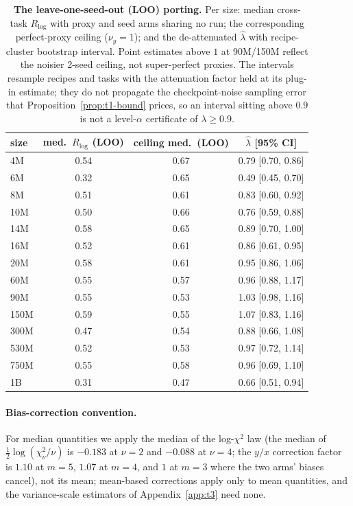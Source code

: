 \begin{table}[!htbp]
\centering
\caption{\textbf{The leave-one-seed-out (LOO) porting.} Per size: median cross-task $R_{\log}$ with
proxy and seed arms sharing no run; the corresponding perfect-proxy ceiling ($\nu_y = 1$); and
the de-attenuated $\hat\lambda$ with recipe-cluster bootstrap interval. Point estimates above
$1$ at 90M/150M reflect the noisier 2-seed ceiling, not super-perfect proxies. The intervals
resample recipes and tasks with the attenuation factor held at its plug-in estimate; they do
not propagate the checkpoint-noise sampling error that
Proposition~\ref{prop:t1-bound} prices, so an interval sitting above $0.9$ is not a
level-$\alpha$ certificate of $\lambda \ge 0.9$.}
\label{tab:lambda-loo}
\footnotesize
\setlength{\tabcolsep}{4pt}
\begin{tabular}{@{}lccc@{}}
\toprule
size & med.\ $R_{\log}$ (LOO) & ceiling med.\ (LOO) & $\hat\lambda$ [95\% CI] \\
\midrule
4M & 0.54 & 0.67 & 0.79 [0.70, 0.86] \\
6M & 0.32 & 0.65 & 0.49 [0.45, 0.70] \\
8M & 0.51 & 0.61 & 0.83 [0.60, 0.92] \\
10M & 0.50 & 0.66 & 0.76 [0.59, 0.88] \\
14M & 0.58 & 0.65 & 0.89 [0.70, 1.00] \\
16M & 0.52 & 0.61 & 0.86 [0.61, 0.95] \\
20M & 0.58 & 0.61 & 0.95 [0.86, 1.06] \\
60M & 0.55 & 0.57 & 0.96 [0.88, 1.17] \\
90M & 0.55 & 0.53 & 1.03 [0.98, 1.16] \\
150M & 0.59 & 0.55 & 1.07 [0.83, 1.16] \\
300M & 0.47 & 0.54 & 0.88 [0.66, 1.08] \\
530M & 0.52 & 0.53 & 0.97 [0.72, 1.14] \\
750M & 0.55 & 0.58 & 0.96 [0.69, 1.10] \\
1B & 0.31 & 0.47 & 0.66 [0.51, 0.94] \\
\bottomrule
\end{tabular}
\end{table}

\paragraph{Bias-correction convention.} For median quantities we apply the median of the
log-$\chi^2$ law (the median of $\tfrac12\log(\chi^2_\nu/\nu)$ is $-0.183$ at $\nu = 2$ and
$-0.088$ at $\nu = 4$; the $y/x$ correction factor is $1.10$ at $m = 5$, $1.07$ at $m = 4$,
and $1$ at $m = 3$ where the two arms' biases cancel), not its mean; mean-based corrections
apply only to mean quantities, and the variance-scale estimators of Appendix~\ref{app:t3}
need none.

